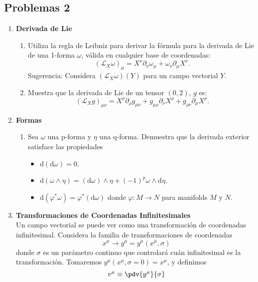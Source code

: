 \documentclass[../main]{subfiles}
\begin{document}
\begin{adjustwidth}{0pt}{-100pt}
\section*{Problemas 2}
\begin{enumerate}
    \item \textbf{Derivada de Lie}
    \begin{enumerate}
        \item Utiliza la regla de Leibniz para derivar la fórmula para la derivada de Lie de una 1-forma $\omega$, válida en cualquier base de coordenadas:
        \begin{equation}
            (\mathcal{L}_X \omega)_{\mu}=X^{\nu} \partial_{\nu} \omega_{\mu}+\omega_{\nu} \partial_{\mu} X^{\nu}.
        \end{equation}
        Sugerencia: Considera $(\mathcal{L}_X \omega)(Y)$ para un campo vectorial $Y$.
        \item Muestra que la derivada de Lie de un tensor $(0, 2)$, $g$ es:
        \begin{equation}
            (\mathcal{L}_X g)_{\mu\nu}=X^{\rho} \partial_{\rho} g_{\mu\nu}+g_{\mu\rho}\partial_{\nu}X^{\rho}+g_{\rho\nu}\partial_{\mu}X^{\rho}.
        \end{equation}
    \end{enumerate}
    \item \textbf{Formas} 
    \begin{enumerate}
        \item Sea $\omega$ una p-forma y $\eta$ una q-forma. Demuestra que la derivada exterior satisface las propiedades 
        \begin{itemize}
            \item $\mathrm{d}(\mathrm{d} \omega)=0$.
            \item $\mathrm{d}(\omega \wedge \eta)=(\mathrm{d} \omega)\wedge \eta+(-1)^p \omega \wedge \mathrm{d}\eta$.
            \item $\mathrm{d}(\varphi^* \omega)=\varphi^*(\mathrm{d}\omega)$ donde $\varphi: M \rightarrow N$ para manifolds $M$ y $N$.
        \end{itemize}
    \end{enumerate}
    \item \textbf{Transformaciones de Coordenadas Infinitesimales}\\
    Un campo vectorial se puede ver como una transformación de coordenadas infinitesimal. Considera la familia de transformaciones de coordenadas 
    \begin{equation}
        x^{\mu} \rightarrow y^{\mu}=y^{\mu}(x^{\mu}, \sigma)
    \end{equation} 
    donde $\sigma$ es un parámetro continuo que controlará cuán infinitesimal es la transformación. Tomaremos $y^{\mu}(x^{\mu}, \sigma=0)=x^{\mu}$, y definimos 
    \begin{equation}
        v^{\mu} \equiv \pdv{y^{\mu}}{\sigma}
    \end{equation}


\end{enumerate}
\end{adjustwidth}
\end{document}
